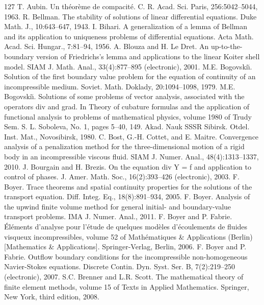 \begin{thebibliography}{127}
 T. Aubin. Un théorème de compacité. C. R. Acad. Sci. Paris, 256:5042–5044, 1963.
 R. Bellman. The stability of solutions of linear differential equations. Duke Math. J., 10:643–647, 1943.
 I. Bihari. A generalization of a lemma of Bellman and its application to uniqueness problems of differential equations. Acta Math. Acad. Sci. Hungar., 7:81–94, 1956.
 A. Blouza and H. Le Dret. An up-to-the-boundary version of Friedrichs’s lemma and applications to the linear Koiter shell model. SIAM J. Math. Anal., 33(4):877–895 (electronic), 2001.
 M.E. Bogovskiı̆. Solution of the first boundary value problem for the equation of continuity of an incompressible medium. Soviet. Math. Doklady, 20:1094–1098, 1979.
 M.E. Bogovskiı̆. Solutions of some problems of vector analysis, associated with the operators div and grad. In Theory of cubature formulas and the application of functional analysis to problems of mathematical physics, volume 1980 of Trudy Sem. S. L. Soboleva, No. 1, pages 5–40, 149. Akad. Nauk SSSR Sibirsk. Otdel. Inst. Mat., Novosibirsk, 1980.
 C. Bost, G.-H. Cottet, and E. Maitre. Convergence analysis of a penalization method for the three-dimensional motion of a rigid body in an incompressible viscous fluid. SIAM J. Numer. Anal., 48(4):1313–1337, 2010.
 J. Bourgain and H. Brezis. On the equation div Y = f and application to control of phases. J. Amer. Math. Soc., 16(2):393–426 (electronic), 2003.
 F. Boyer. Trace theorems and spatial continuity properties for the solutions of the transport equation. Diff. Integ. Eq., 18(8):891–934, 2005.
 F. Boyer. Analysis of the upwind finite volume method for general initial- and boundary-value transport problems. IMA J. Numer. Anal., 2011.
 F. Boyer and P. Fabrie. Éléments d’analyse pour l’étude de quelques modèles d’écoulements de fluides visqueux incompressibles, volume 52 of Mathématiques \& Applications (Berlin) [Mathematics \& Applications]. Springer-Verlag, Berlin, 2006.
 F. Boyer and P. Fabrie. Outflow boundary conditions for the incompressible non-homogeneous Navier-Stokes equations. Discrete Contin. Dyn. Syst. Ser. B, 7(2):219–250 (electronic), 2007.
 S.C. Brenner and L.R. Scott. The mathematical theory of finite element methods, volume 15 of Texts in Applied Mathematics. Springer, New York, third edition, 2008.

\end{thebibliography}
